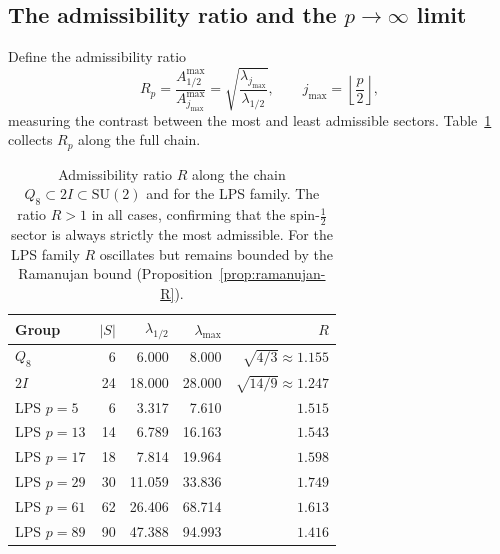 \subsection{The admissibility ratio and the $p \to \infty$ limit}
  \label{sec:step6d}

  Define the admissibility ratio
  \begin{equation}
    R_p = \frac{A^{\max}_{1/2}}{A^{\max}_{j_{\max}}}
    = \sqrt{\frac{\lambda_{j_{\max}}}{\lambda_{1/2}}},
    \qquad
    j_{\max} = \left\lfloor \frac{p}{2} \right\rfloor,
    \label{eq:ratio-lps}
  \end{equation}
  measuring the contrast between the most and least admissible sectors.
  Table~\ref{tab:lps-chain} collects $R_p$ along the full chain.

  \begin{table}[h]
    \centering
    \renewcommand{\arraystretch}{1.25}
    \begin{tabular}{lrrrr}
      \hline
      Group        & $|S|$ & $\lambda_{1/2}$ & $\lambda_{\max}$ & $R$                         \\
      \hline
      $Q_8$        & 6     & 6.000           & 8.000            & $\sqrt{4/3} \approx 1.155$  \\
      $2I$         & 24    & 18.000          & 28.000           & $\sqrt{14/9} \approx 1.247$ \\
      LPS $p = 5$  & 6     & 3.317           & 7.610            & $1.515$                     \\
      LPS $p = 13$ & 14    & 6.789           & 16.163           & $1.543$                     \\
      LPS $p = 17$ & 18    & 7.814           & 19.964           & $1.598$                     \\
      LPS $p = 29$ & 30    & 11.059          & 33.836           & $1.749$                     \\
      LPS $p = 61$ & 62    & 26.406          & 68.714           & $1.613$                     \\
      LPS $p = 89$ & 90    & 47.388          & 94.993           & $1.416$                     \\
      \hline
    \end{tabular}
    \caption{Admissibility ratio $R$ along the chain
      $Q_8 \subset 2I \subset \mathrm{SU}(2)$ and for the LPS family.
      The ratio $R > 1$ in all cases, confirming that the spin-$\tfrac{1}{2}$
      sector is always strictly the most admissible.
      For the LPS family $R$ oscillates but remains bounded by the Ramanujan
      bound (Proposition~\ref{prop:ramanujan-R}).}
    \label{tab:lps-chain}
  \end{table}

